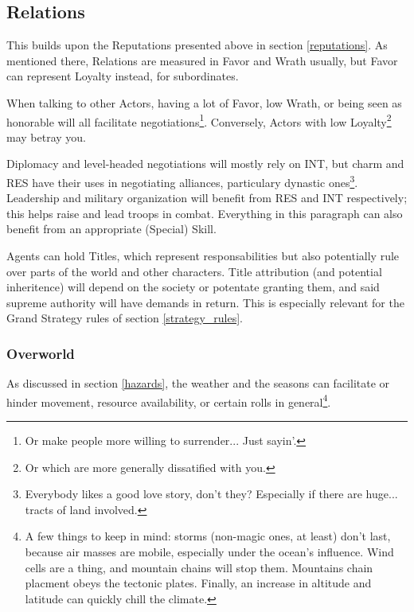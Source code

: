\subsection{Relations}

\label{relations}

This builds upon the Reputations presented above in section \ref{reputations}. As mentioned there, Relations are measured in Favor and Wrath usually, but Favor can represent Loyalty instead, for subordinates.

When talking to other Actors, having a lot of Favor, low Wrath, or being seen as honorable will all facilitate negotiations\footnote{Or make people more willing to surrender... Just sayin'.}. Conversely, Actors with low Loyalty\footnote{Or which are more generally dissatified with you.} may betray you.

Diplomacy and level-headed negotiations will mostly rely on INT, but charm and RES have their uses in negotiating alliances, particulary dynastic ones\footnote{Everybody likes a good love story, don't they? Especially if there are huge... tracts of land involved.}. Leadership and military organization will benefit from RES and INT respectively; this helps raise and lead troops in combat. Everything in this paragraph can also benefit from an appropriate (Special) Skill.

Agents can hold Titles, which represent responsabilities but also potentially rule over parts of the world and other characters. Title attribution (and potential inheritence) will depend on the society or potentate granting them, and said supreme authority will have demands in return. This is especially relevant for the Grand Strategy rules of section \ref{strategy_rules}.



\subsubsection{Overworld}



As discussed in section \ref{hazards}, the weather and the seasons can facilitate or hinder movement, resource availability, or certain rolls in general\footnote{A few things to keep in mind: storms (non-magic ones, at least) don't last, because air masses are mobile, especially under the ocean's influence. Wind cells are a thing, and mountain chains will stop them. Mountains chain placment obeys the tectonic plates. Finally, an increase in altitude and latitude can quickly chill the climate.}. 

